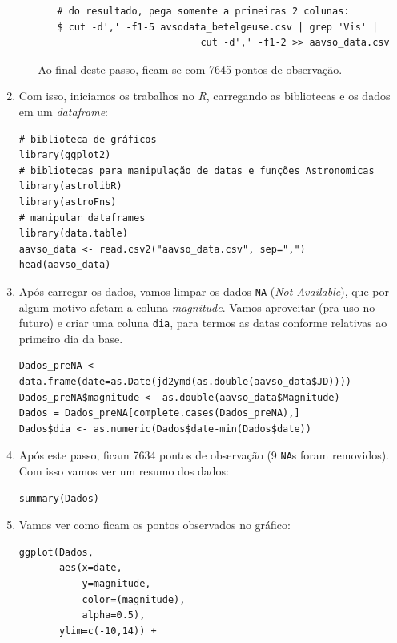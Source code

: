 \documentclass[a4paper,12pt]{article}
\begin{document}
\begin{enumerate}
\begin{enumerate}
\begin{enumerate}
\begin{lstlisting}[lang=bash]
# do resultado, pega somente a primeiras 2 colunas:
$ cut -d',' -f1-5 avsodata_betelgeuse.csv | grep 'Vis' |
                         cut -d',' -f1-2 >> aavso_data.csv
            \end{lstlisting}    
        \end{enumerate}
        Ao final deste passo, ficam-se com 7645 pontos de observação.
    \end{enumerate}
    \item Com isso, iniciamos os trabalhos no \textit{R}, carregando as bibliotecas e os dados em um \textit{dataframe}:
        \begin{lstlisting}[lang=R]
# biblioteca de gráficos
library(ggplot2)
# bibliotecas para manipulação de datas e funções Astronomicas
library(astrolibR)
library(astroFns)
# manipular dataframes
library(data.table)
aavso_data <- read.csv2("aavso_data.csv", sep=",")
head(aavso_data)
        \end{lstlisting}   
    \item Após carregar os dados, vamos limpar os dados \texttt{NA} (\textit{Not Available}), que por algum motivo afetam a coluna \textit{magnitude}. Vamos aproveitar (pra uso no futuro) e criar uma coluna \texttt{dia}, para termos as datas conforme relativas ao primeiro dia da base.
        \begin{lstlisting}
Dados_preNA <- data.frame(date=as.Date(jd2ymd(as.double(aavso_data$JD))))
Dados_preNA$magnitude <- as.double(aavso_data$Magnitude)
Dados = Dados_preNA[complete.cases(Dados_preNA),]
Dados$dia <- as.numeric(Dados$date-min(Dados$date))
        \end{lstlisting}    
    \item Após este passo, ficam 7634 pontos de observação (9 \texttt{NA}s foram removidos). Com isso vamos ver um resumo dos dados:
         \begin{lstlisting}
summary(Dados)
        \end{lstlisting}  
    \item Vamos ver como ficam os pontos observados no gráfico:
        \begin{lstlisting}
ggplot(Dados,
       aes(x=date,     
           y=magnitude,      
           color=(magnitude),       
           alpha=0.5), 
       ylim=c(-10,14)) +


\end{lstlisting}
\end{enumerate}
\end{document}
